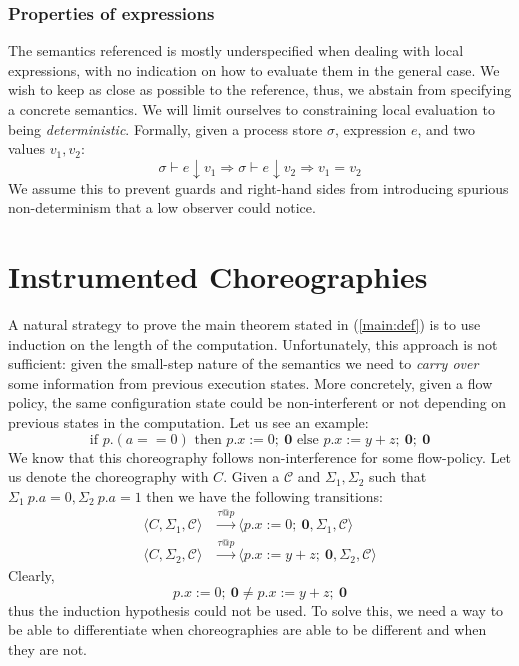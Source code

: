 \documentclass[12pt,a4paper,twoside]{book}
\begin{document}
\subsubsection{Properties of expressions}
The semantics referenced\cite{montesi2023introduction} is mostly underspecified when dealing with local expressions, with no indication on how to evaluate them in the general case.
We wish to keep as close as possible to the reference, thus, we abstain from specifying a concrete semantics.
We will limit ourselves to constraining local evaluation to being \emph{deterministic}.
Formally, given a process store $\sigma$, expression $e$, and two values $v_1, v_2$:
$$
\sigma \vdash e \downarrow v_1 \Rightarrow
\sigma \vdash e \downarrow v_2 \Rightarrow v_1 = v_2
$$
We assume this to prevent guards and right-hand sides from introducing spurious non-determinism that a low observer could notice.

\section{Instrumented Choreographies}
A natural strategy to prove the main theorem stated in (\ref{main:def}) is to use induction on the length of the computation. Unfortunately, this approach is not sufficient: given the small-step nature of the semantics we need to \emph{carry over} some information from previous execution states.
More concretely, given a flow policy, the same configuration state could be non-interferent or not depending on previous states in the computation. Let us see an example:
$$ \text{if } p.(a == 0) \text{ then } p.x := 0; ~ \boldsymbol{0} \text{ else } p.x := y + z; ~ \boldsymbol{0}; ~ \boldsymbol{0} $$
We know that this choreography follows non-interference for some flow-policy. Let us denote the choreography with $C$.
Given a $\mathscr{C}$ and $\Sigma_1, \Sigma_2$ such that $\Sigma_1~p.a = 0, \Sigma_2~p.a = 1$ then we have the following transitions:
\begin{align*}
	\langle C, \Sigma_1, \mathscr{C} \rangle &\xrightarrow{\tau @p}
	\langle p.x := 0;~ \boldsymbol{0}, \Sigma_1, \mathscr{C} \rangle \\
	\langle C, \Sigma_2, \mathscr{C} \rangle &\xrightarrow{\tau @p}
	\langle p.x := y + z;~ \boldsymbol{0}, \Sigma_2, \mathscr{C} \rangle
\end{align*}
Clearly, 
$$p.x := 0;~ \boldsymbol{0} \ne p.x := y + z;~ \boldsymbol{0}$$
thus the induction hypothesis could not be used. To solve this, we need a way to be able to differentiate when choreographies are able to be different and when they are not.
\end{document}
